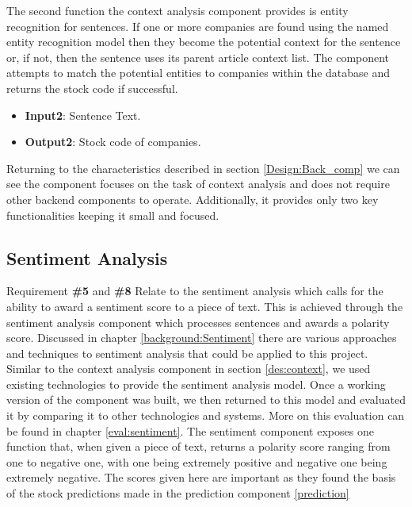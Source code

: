         The second function the context analysis component provides is entity recognition for sentences. If one or more companies are found using the named entity recognition model then they become the potential context for the sentence or, if not, then the sentence uses its parent article context list. The component attempts to match the potential entities to companies within the database and returns the stock code if successful. 
        
        \begin{itemize}
            \item \textbf{Input2}: Sentence Text.
            \item \textbf{Output2}: Stock code of companies.
        \end{itemize}
        
        Returning to the characteristics described in section \ref{Design:Back_comp} we can see the component focuses on the task of context analysis and does not require other backend components to operate. Additionally, it provides only two key functionalities keeping it small and focused.
        
       
        \subsection{Sentiment Analysis}
        Requirement \textbf{\#5} and \textbf{\#8} Relate to the sentiment analysis which calls for the ability to award a sentiment score to a piece of text. This is achieved through the sentiment analysis component which processes sentences and awards a polarity score. Discussed in chapter \ref{background:Sentiment} there are various approaches and techniques to sentiment analysis that could be applied to this project. Similar to the context analysis component in section \ref{des:context}, we used existing technologies to provide the sentiment analysis model. Once a working version of the component was built, we then returned to this model and evaluated it by comparing it to other technologies and systems. More on this evaluation can be found in chapter \ref{eval:sentiment}. The sentiment component exposes one function that, when given a piece of text, returns a polarity score ranging from one to negative one, with one being extremely positive and negative one being extremely negative. The scores given here are important as they found the basis of the stock predictions made in the prediction component \ref{prediction}
        
